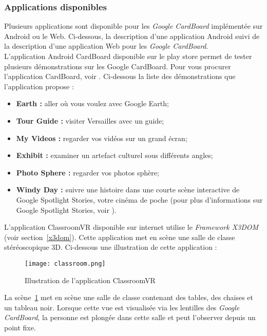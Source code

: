 \subsubsection*{Applications disponibles}  \label{dispo}
Plusieurs applications sont disponible pour les \textit{Google CardBoard} implémentée sur \textsf{Android} ou le Web. Ci-dessous, la description d'une application \textsf{Android} suivi de la description d'une application Web pour les \textit{Google CardBoard}.\\
L'\textsf{application Android CardBoard} disponible sur le play store permet de tester plusieurs démonstrations sur les Google CardBoard. Pour vous procurer l'application \textsf{CardBoard}, voir \cite{androidCardboard}. Ci-dessous la liste des démonstrations que l'application propose : 
\pagebreak
\begin{itemize}
\item \textbf{Earth : } aller où vous voulez avec \textsf{Google Earth};
\item \textbf{Tour Guide : } visiter Versailles avec un guide;
\item \textbf{My Videos : } regarder vos vidéos sur un grand écran;
\item \textbf{Exhibit : } examiner un artefact culturel sous différents angles;
\item \textbf{Photo Sphere : } regarder vos photos sphère;
\item \textbf{Windy Day : } suivre une histoire dans une courte scène interactive de \textsf{Google Spotlight Stories}, votre cinéma de poche (pour plus d'informations sur \textsf{Google Spotlight Stories}, voir \cite{spotlight}).\\

\end{itemize}
L'\textsf{application ClassroomVR} disponible sur internet utilise le \textit{Framework X3DOM} (voir section~\ref{x3dom}). Cette application met en scène une salle de classe stéréoscopique 3D. Ci-dessous une illustration de cette application : 

\begin{figure}[H]
\centering
\texttt{[image: classroom.png]}
\caption{\label{classroom} Illustration de l'\textsf{application ClassroomVR}}
\end{figure}
La scène~\ref{classroom} met en scène une salle de classe contenant des tables, des chaises et un tableau noir. Lorsque cette vue est visualisée via les lentilles des \textit{Google CardBoard}, la personne est plongée dans cette salle et peut l'observer depuis un point fixe.


